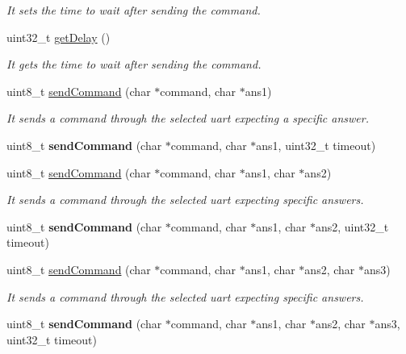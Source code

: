 \begin{DoxyCompactItemize}
\begin{DoxyCompactList}\small\item\em It sets the time to wait after sending the command. \end{DoxyCompactList}\item 
uint32\+\_\+t \hyperlink{class_wasp_u_a_r_t_aa574d0486fec81153bb63459ce39671b}{get\+Delay} ()\hypertarget{class_wasp_u_a_r_t_aa574d0486fec81153bb63459ce39671b}{}\label{class_wasp_u_a_r_t_aa574d0486fec81153bb63459ce39671b}

\begin{DoxyCompactList}\small\item\em It gets the time to wait after sending the command. \end{DoxyCompactList}\item 
uint8\+\_\+t \hyperlink{class_wasp_u_a_r_t_a0c40fe5e1a96a4ca3d578dce18841809}{send\+Command} (char $\ast$command, char $\ast$ans1)
\begin{DoxyCompactList}\small\item\em It sends a command through the selected uart expecting a specific answer. \end{DoxyCompactList}\item 
uint8\+\_\+t {\bfseries send\+Command} (char $\ast$command, char $\ast$ans1, uint32\+\_\+t timeout)\hypertarget{class_wasp_u_a_r_t_abd49c0318d4062374c0d0a810edacd15}{}\label{class_wasp_u_a_r_t_abd49c0318d4062374c0d0a810edacd15}

\item 
uint8\+\_\+t \hyperlink{class_wasp_u_a_r_t_a1e567d5047e7a65d6c922bcd4fb45f13}{send\+Command} (char $\ast$command, char $\ast$ans1, char $\ast$ans2)
\begin{DoxyCompactList}\small\item\em It sends a command through the selected uart expecting specific answers. \end{DoxyCompactList}\item 
uint8\+\_\+t {\bfseries send\+Command} (char $\ast$command, char $\ast$ans1, char $\ast$ans2, uint32\+\_\+t timeout)\hypertarget{class_wasp_u_a_r_t_afe84fa499b88212c9e10bb38f477d0e6}{}\label{class_wasp_u_a_r_t_afe84fa499b88212c9e10bb38f477d0e6}

\item 
uint8\+\_\+t \hyperlink{class_wasp_u_a_r_t_a6b799c9b2bf78b1d7d020cbb2f892b07}{send\+Command} (char $\ast$command, char $\ast$ans1, char $\ast$ans2, char $\ast$ans3)
\begin{DoxyCompactList}\small\item\em It sends a command through the selected uart expecting specific answers. \end{DoxyCompactList}\item 
uint8\+\_\+t {\bfseries send\+Command} (char $\ast$command, char $\ast$ans1, char $\ast$ans2, char $\ast$ans3, uint32\+\_\+t timeout)\hypertarget{class_wasp_u_a_r_t_ab7aedc7a280de96707cea09eda419874}{}\label{class_wasp_u_a_r_t_ab7aedc7a280de96707cea09eda419874}


\end{DoxyCompactItemize}
